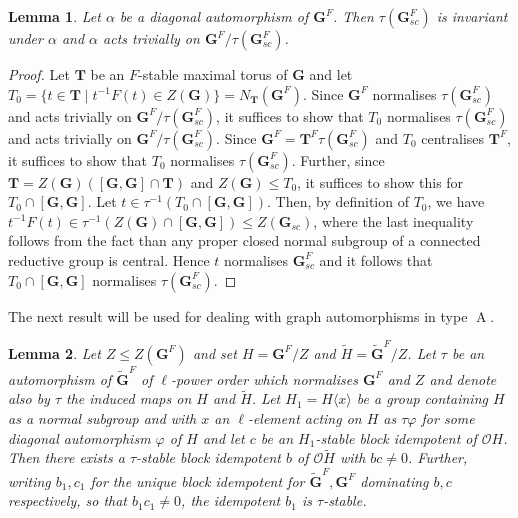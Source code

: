 \documentclass{amsart}
\theoremstyle{plain}\newtheorem{Theorem}{Theorem}[section]
\theoremstyle{plain}\newtheorem{Conjecture}[Theorem]{Conjecture}
\theoremstyle{plain}\newtheorem{Corollary}[Theorem]{Corollary}
\theoremstyle{plain}\newtheorem{Lemma}[Theorem]{Lemma}
\theoremstyle{plain}\newtheorem{Proposition}[Theorem]{Proposition}
\theoremstyle{definition}\newtheorem{Definition}[Theorem]{Definition}
\theoremstyle{definition}\newtheorem{Example}[Theorem]{Example}
\theoremstyle{definition}\newtheorem{Examples}[Theorem]{Examples}
\theoremstyle{definition}\newtheorem{Exercise}[Theorem]{Exercise}
\theoremstyle{definition}\newtheorem{Notation}[Theorem]{Notation}
\theoremstyle{definition}\newtheorem{Remark}[Theorem]{Remark}
\theoremstyle{definition}\newtheorem{Remarks}[Theorem]{Remarks}
\def\CO{{\mathcal{O}}}    \def\OPE{{\mathcal{O}(P\rtimes E)}}
\newcommand{\bG}{{\mathbf{G}}}
\newcommand{\bT}{{\mathbf{T}}}
\newcommand{\type}{\operatorname}
\numberwithin{equation}{section}
\begin{document}
\begin{Lemma} \label{lem:sccovering}     Let $\alpha $ be  a  diagonal automorphism  of   $\bG^F$.  Then $\tau (\bG_{sc}^F) $  is invariant under   $\alpha $ and   $\alpha  $   acts  trivially on $\bG^F/ \tau(\bG_{sc}^F) $.
\end{Lemma}


\begin{proof} Let  $\bT$  be an $F$-stable  maximal torus  of  $\bG$ and let  $T_0  =\{ t \in \bT  \mid  t^{-1}F(t) \in Z(\bG) \} = N_{\bT} (\bG^F)$.   Since   $\bG^F $  normalises  $\tau (\bG_{sc}^F) $   and  acts trivially on  $\bG^F/  \tau (\bG^F_{sc} )$, it suffices  to show that  $T_0$  normalises  $\tau(\bG_{sc}^F) $ and acts trivially on $\bG^F/  \tau (\bG^F_{sc} )$. Since  $\bG^F  =  \bT^F \tau (\bG^F_{sc} )$  and $T_0$   centralises  $\bT^F$, it suffices to show that  $T_0$  normalises  $\tau(\bG_{sc}^F) $.
Further,  since  $\bT =  Z(\bG)([\bG, \bG] \cap \bT ) $  and   $ Z(\bG)  \leq T_0 $,  it suffices  to show this for  $T_0 \cap  [\bG, \bG]$. Let $t\in \tau^{-1}(T_0 \cap  [\bG, \bG])$. Then, by definition of $T_0$, we have $t^{-1}F(t)\in\tau^{-1}(Z(\bG)\cap [\bG,\bG])\leq Z(\bG_{sc})$,  where the  last inequality follows from the  fact than any  proper closed normal  subgroup of  a  connected  reductive group is central. Hence $t$ normalises $\bG_{sc}^F$   and  it follows that  $T_0 \cap  [\bG, \bG]$  normalises   $\tau (\bG_{sc}^F) $. 
\end{proof}

The next result will be used for dealing with graph automorphisms in type $\type{A}$. 
\begin{Lemma} \label{lem-red-graph2}   Let $Z \leq Z(\bG^F)$ and  set $H = \bG^F/Z$  and  $\tilde H= \tilde \bG^F/Z$. Let $\tau $ be  an automorphism  of $\tilde \bG^F$ of $\ell$-power order  which normalises  $\bG^F$ and $Z$ and denote also by $\tau $  the induced maps on  $H$ and $\tilde H$. Let $H_1=H\langle x \rangle $   be a  group  containing $H$ as  a normal subgroup  and with $x$ an  $\ell$-element acting  on $H$ as $\tau \varphi $ for  some  diagonal  automorphism $\varphi$ of $H$  and let  $c$ be  an $H_1$-stable block idempotent of $\CO H$.
Then there exists  a   $\tau$-stable block idempotent  $b$  of   $\CO \tilde H$ with $bc \ne 0$.
Further, writing $b_1, c_1$ for the unique block idempotent for $\tilde \bG^F, \bG^F$ dominating  $b,c$ respectively, so that $b_1c_1 \neq 0$, the idempotent $b_1$ is $\tau$-stable. 
\end{Lemma}
\end{document}
